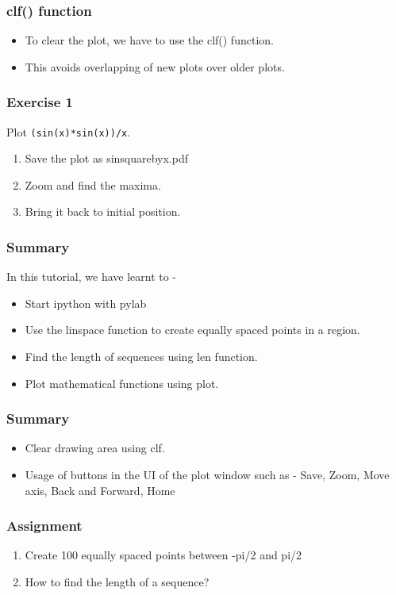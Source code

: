 \documentclass[17pt]{beamer}
\newcounter{saveenumi}
\newcommand{\seti}{\setcounter{saveenumi}{\value{enumi}}}
\begin{document}
\begin{frame}
\frametitle{clf() function}
\begin{itemize}
\item To clear the plot, we have to use the clf() function.
\item This avoids overlapping of new plots over older plots.
\end{itemize}
\end{frame}

\begin{frame}
\frametitle{Exercise 1}
\label{sec-5}
Plot \texttt{(sin(x)*sin(x))/x}.
\begin{enumerate}
\item Save the plot as sinsquarebyx.pdf
\item Zoom and find the maxima.
\item Bring it back to initial position.
\end{enumerate}
\end{frame}
\begin{frame}
\frametitle{Summary}
\label{sec-6.1}
In this tutorial, we have learnt to -
\begin{itemize}
\item Start ipython with pylab
\item Use the linspace function to create equally spaced points in a region.
\item Find the length of sequences using len function.
\item Plot mathematical functions using plot.
\end{itemize}
\end{frame}
\begin{frame}
\frametitle{Summary}
\label{sec-6.2}
\begin{itemize}
\item Clear drawing area using clf.
\item Usage of buttons in the UI of the plot window such as - Save, Zoom, Move axis, Back and Forward, Home
\end{itemize}
\end{frame}
\begin{frame}
\frametitle{Assignment}
\label{sec-7.1}
\begin{enumerate}
\item Create 100 equally spaced points between -pi/2 and pi/2
\item How to find the length of a sequence?
	\seti
\end{enumerate}
\end{frame}
\end{document}
